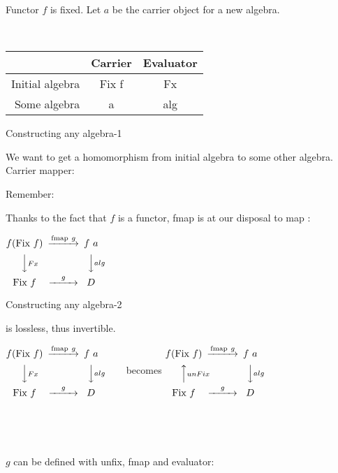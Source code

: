 \documentclass{beamer}
\newcommand{\hin}[2]{}
\begin{document}
\begin{frame}[fragile]

Functor $f$ is fixed. Let $a$ be the carrier object for a new algebra.

~

\begin{tabular}{r | c | c}
 ~ & Carrier & Evaluator\\\hline
Initial algebra&   Fix f & Fx\\\hline
Some algebra &     a & alg \\
\end{tabular}

\end{frame}

\begin{frame}[fragile]{Constructing any algebra-1}


We want to get a homomorphism from initial algebra to some other algebra. Carrier mapper:


Remember: \hin{16}{16}


Thanks to the fact that $f$ is a functor, fmap is at our disposal to map : 


\begin{center}
$
\begin{CD}
f (\text{Fix} \ f) @>\text{fmap} \ g>> f\ a\\
@VVFxV @VValgV\\
\text{Fix} \ f @>g>> D
\end{CD}
$

\end{center}
\end{frame}


\begin{frame}[fragile]{Constructing any algebra-2}

 is lossless, thus invertible.

\hin{106}{107}

$
\begin{CD}
f (\text{Fix} \ f) @>\text{fmap} \ g>> f\ a\\
@VVFxV @VValgV\\
\text{Fix} \ f @>g>> D
\end{CD}
$
~~~~~becomes 
$
\begin{CD}
f (\text{Fix} \ f) @>\text{fmap} \ g>> f\ a\\
@AAunFixA @VValgV\\
\text{Fix} \ f @>g>> D
\end{CD}
$

~

~

$g$ can be defined with unfix, fmap and evaluator:

\hin{110}{110}
\end{frame}
\end{document}
